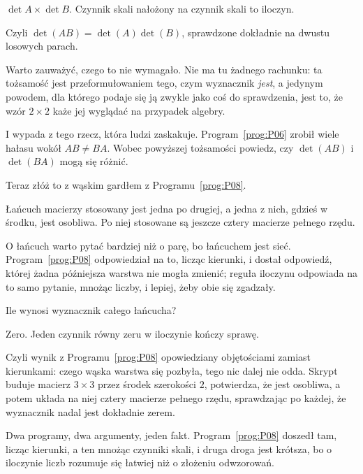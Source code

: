 \begin{fr}
\begin{ansblock}
$\det A \times \det B$. Czynnik skali nałożony na czynnik skali to iloczyn.
\end{ansblock}

Czyli $\det(AB) = \det(A)\det(B)$, sprawdzone dokładnie na dwustu losowych
parach.

Warto zauważyć, czego to nie wymagało. Nie ma tu żadnego rachunku: ta tożsamość
jest przeformułowaniem tego, czym wyznacznik \emph{jest}, a jedynym powodem,
dla którego podaje się ją zwykle jako coś do sprawdzenia, jest to, że wzór
$2 \times 2$ każe jej wyglądać na przypadek algebry.

I wypada z tego rzecz, która ludzi zaskakuje.
Program~\ref{prog:P06} zrobił wiele hałasu wokół $AB \ne BA$. Wobec powyższej
tożsamości powiedz, czy $\det(AB)$ i $\det(BA)$ mogą się różnić.
\dotline
\nextframe
\end{fr}

\begin{fr}
Teraz złóż to z wąskim gardłem z Programu~\ref{prog:P08}.

Łańcuch macierzy stosowany jest jedna po drugiej, a jedna z nich, gdzieś w
środku, jest osobliwa. Po niej stosowane są jeszcze cztery macierze pełnego
rzędu.

O łańcuch warto pytać bardziej niż o parę, bo łańcuchem jest sieć.
Program~\ref{prog:P08} odpowiedział na to, licząc kierunki, i dostał
odpowiedź, której żadna późniejsza warstwa nie mogła zmienić; reguła iloczynu
odpowiada na to samo pytanie, mnożąc liczby, i lepiej, żeby obie się zgadzały.

Ile wynosi wyznacznik całego łańcucha?
\dotline
\nextframe
\end{fr}

\begin{fr}
\begin{ansblock}
Zero. Jeden czynnik równy zeru w iloczynie kończy sprawę.
\end{ansblock}

Czyli wynik z Programu~\ref{prog:P08} opowiedziany objętościami zamiast
kierunkami: czego wąska warstwa się pozbyła, tego nic dalej nie odda. Skrypt
buduje macierz $3 \times 3$ przez środek szerokości $2$, potwierdza, że jest
osobliwa, a potem układa na niej cztery macierze pełnego rzędu, sprawdzając po
każdej, że wyznacznik nadal jest dokładnie zerem.

Dwa programy, dwa argumenty, jeden fakt. Program~\ref{prog:P08} doszedł tam,
licząc kierunki, a ten mnożąc czynniki skali, i druga droga jest krótsza, bo o
iloczynie liczb rozumuje się łatwiej niż o złożeniu odwzorowań.
\end{fr}

